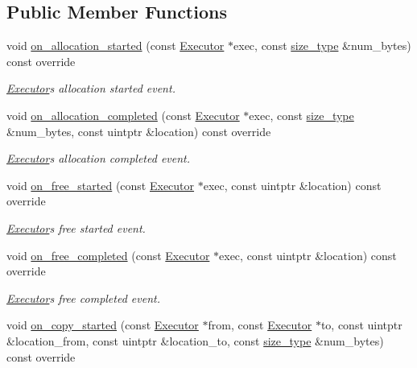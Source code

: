 \subsection*{Public Member Functions}
\begin{DoxyCompactItemize}
\item 
void \hyperlink{classgko_1_1log_1_1Record_af3817911ba7d0156173e81915475a3e9}{on\+\_\+allocation\+\_\+started} (const \hyperlink{classgko_1_1Executor}{Executor} $\ast$exec, const \hyperlink{namespacegko_a6e5c95df0ae4e47aab2f604a22d98ee7}{size\+\_\+type} \&num\+\_\+bytes) const override
\begin{DoxyCompactList}\small\item\em \hyperlink{classgko_1_1Executor}{Executor}\textquotesingle{}s allocation started event. \end{DoxyCompactList}\item 
void \hyperlink{classgko_1_1log_1_1Record_a197ace14db88f4205ed389f3ab66f1e9}{on\+\_\+allocation\+\_\+completed} (const \hyperlink{classgko_1_1Executor}{Executor} $\ast$exec, const \hyperlink{namespacegko_a6e5c95df0ae4e47aab2f604a22d98ee7}{size\+\_\+type} \&num\+\_\+bytes, const uintptr \&location) const override
\begin{DoxyCompactList}\small\item\em \hyperlink{classgko_1_1Executor}{Executor}\textquotesingle{}s allocation completed event. \end{DoxyCompactList}\item 
void \hyperlink{classgko_1_1log_1_1Record_a8504ad719285da3e6058ac4605c26f78}{on\+\_\+free\+\_\+started} (const \hyperlink{classgko_1_1Executor}{Executor} $\ast$exec, const uintptr \&location) const override
\begin{DoxyCompactList}\small\item\em \hyperlink{classgko_1_1Executor}{Executor}\textquotesingle{}s free started event. \end{DoxyCompactList}\item 
void \hyperlink{classgko_1_1log_1_1Record_adf97da4b8dbc28cebb83c57a73204fe5}{on\+\_\+free\+\_\+completed} (const \hyperlink{classgko_1_1Executor}{Executor} $\ast$exec, const uintptr \&location) const override
\begin{DoxyCompactList}\small\item\em \hyperlink{classgko_1_1Executor}{Executor}\textquotesingle{}s free completed event. \end{DoxyCompactList}\item 
void \hyperlink{classgko_1_1log_1_1Record_a3ea958c37228262151197ac2daa61f89}{on\+\_\+copy\+\_\+started} (const \hyperlink{classgko_1_1Executor}{Executor} $\ast$from, const \hyperlink{classgko_1_1Executor}{Executor} $\ast$to, const uintptr \&location\+\_\+from, const uintptr \&location\+\_\+to, const \hyperlink{namespacegko_a6e5c95df0ae4e47aab2f604a22d98ee7}{size\+\_\+type} \&num\+\_\+bytes) const override

\end{DoxyCompactItemize}

